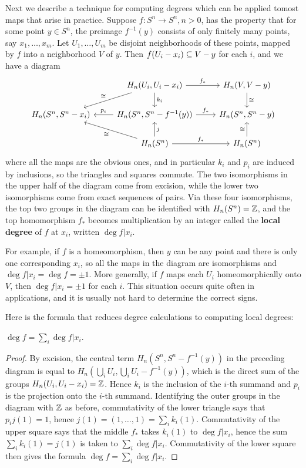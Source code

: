 Next we describe a technique for computing degrees which can be applied tomost maps that arise in practice. Suppose $f:S^n\to S^n,n>0$, has the property that for some point $y\in S^n$, the preimage $f^{-1}(y)$ consists of only finitely many points, say $x_1,\dots,x_m$. Let $U_1,\dots,U_m$ be disjoint neighborhoods of these points, mapped by $f$ into a neighborhood $V$ of $y$. Then $f(U_i-x_i)\subseteq V-y$ for each $i$, and we have a diagram
\[\begin{tikzcd}
&H_n(U_i,U_i-x_i)\ar[r,"f_*"]\ar[d,"k_i"]\ar[ld,swap,"\cong"]&H_n(V,V-y)\ar[d,"\cong"]\\
H_n(S^n,S^n-x_i)&H_n(S^n,S^n-f^{-1}(y))\ar[l,swap,"p_i"]\ar[r,"f_*"]&H_n(S^n,S^n-y)\\
&H_n(S^n)\ar[lu,"\cong"]\ar[r,"f_*"]\ar[u,swap,"j"]&H_n(S^n)\ar[u,"\cong"]
\end{tikzcd}\]
where all the maps are the obvious ones, and in particular $k_i$ and $p_i$ are induced by inclusions, so the triangles and squares commute. The two isomorphisms in the upper half of the diagram come from excision, while the lower two isomorphisms come from exact sequences of pairs. Via these four isomorphisms, the top two groups in the diagram can be identified with $H_n(S^n)=\mathbb{Z}$, and the top homomorphism $f_*$ becomes multiplication by an integer called the \textbf{local degree} of $f$ at $x_i$, written $\deg f|x_i$.\par
For example, if $f$ is a homeomorphism, then $y$ can be any point and there is only one corresponding $x_i$, so all the maps in the diagram are isomorphisms and $\deg f|x_i=\deg f=\pm1$. More generally, if $f$ maps each $U_i$ homeomorphically onto $V$, then $\deg f|x_i=\pm1$ for each $i$. This situation occurs quite often in applications, and it is usually not hard to determine the correct signs.\par
Here is the formula that reduces degree calculations to computing local degrees:
\begin{proposition}
$\deg f=\sum_i\deg f|x_i$.
\end{proposition}
\begin{proof}
By excision, the central term $H_n(S^n,S^n-f^{-1}(y))$ in the preceding diagram is equal to $H_n(\bigcup_iU_i,\bigcup_iU_i-f^{-1}(y))$, which is the direct sum of the groups $H_n(U_i,U_i-x_i)=\mathbb{Z}$. Hence $k_i$ is the inclusion of the $i$-th summand and $p_i$ is the projection onto the $i$-th summand. Identifying the outer groups in the diagram with $\mathbb{Z}$ as before, commutativity of the lower triangle says that $p_ij(1)=1$, hence $j(1)=(1,\dots,1)=\sum_ik_i(1)$. Commutativity of the upper square says that the middle $f_*$ takes $k_i(1)$ to $\deg f|x_i$, hence the sum $\sum_ik_i(1)=j(1)$ is taken to $\sum_i\deg f|x_i$. Commutativity of the lower square then gives the formula $\deg f=\sum_i\deg f|x_i$.
\end{proof}
